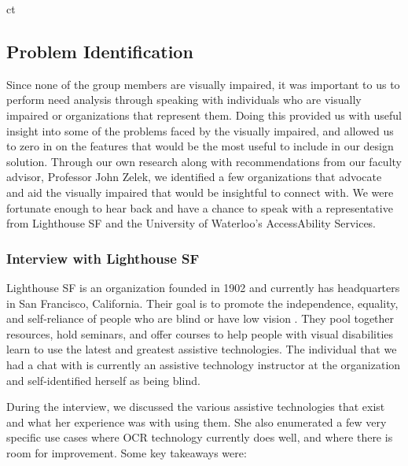 ct\documentclass[a4paper,11pt]{article}
\begin{document}
\subsection{Problem Identification}
Since none of the group members are visually impaired, it was important to us to perform need analysis through speaking with individuals who are visually impaired or organizations that represent them. Doing this provided us with useful insight into some of the problems faced by the visually impaired, and allowed us to zero in on the features that would be the most useful to include in our design solution. Through our own research along with recommendations from our faculty advisor, Professor John Zelek, we identified a few organizations that advocate and aid the visually impaired that would be insightful to connect with. We were fortunate enough to hear back and have a chance to speak with a representative from Lighthouse SF and the University of Waterloo's AccessAbility Services.

\subsubsection{Interview with Lighthouse SF}
Lighthouse SF is an organization founded in 1902 and currently has headquarters in San Francisco, California. Their goal is to promote the independence, equality, and self-reliance of people who are blind or have low vision \cite{lighthouse-sf-homepage}. They pool together resources, hold seminars, and offer courses to help people with visual disabilities learn to use the latest and greatest assistive technologies. The individual that we had a chat with is currently an assistive technology instructor at the organization and self-identified herself as being blind.

During the interview, we discussed the various assistive technologies that exist and what her experience was with using them. She also enumerated a few very specific use cases where OCR technology currently does well, and where there is room for improvement. Some key takeaways were:
\end{document}
